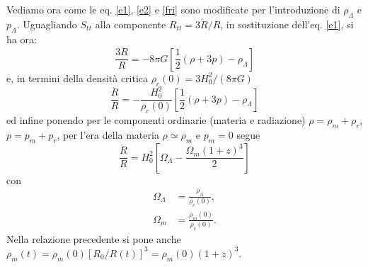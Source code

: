 Vediamo ora come le eq. \eqref{e1}, \eqref{e2} e \eqref{fri} sono modificate per
l'introduzione di $\rho_{\Lambda}$ e $p_{\Lambda}$.  Uguagliando $S_{tt}$ alla
componente $R_{tt}= 3 \ddot{R}/R$, in sostituzione dell'eq. \eqref{e1}, si ha
ora:
\begin{equation}
  \frac{3 \ddot{R}}{R} = - 8\pi G \left[ \frac{1}{2}  (\rho+3p) - \rho_{\Lambda}
  \right]
  \label{ecc1}
\end{equation}
e, in termini della densità critica $\rho_c(0)=3H_0^2/(8\pi G)$
\begin{equation}
  \frac {\ddot{R}} {R} = - \frac {H_0^2} {\rho_c(0)}
  \left[
    \frac {1}{2}  (\rho+3p) - \rho_{\Lambda}
  \right]
\label{2.63}
\end{equation}
ed infine ponendo per le componenti ordinarie (materia e radiazione)
$\rho=\rho_m+\rho_r$, $p=p_m+p_r$, per l'era della materia $\rho
\simeq \rho_m$ e $p_m=0$ segue
\begin{equation}
  \label{ddRcc}
  \frac {\ddot{R}} {R} = H_0^2
  \left[ \Omega_{\Lambda} -\frac{\Omega_m (1+z)^3}{2} \right]
\end{equation}
con
\begin{subequations}
  \begin{align}
    \Omega_{\Lambda} &= \frac{\rho_{\Lambda}}{\rho_c(0)}, \\
    \Omega_m       &= \frac{\rho_m(0)}{\rho_c(0)}.
  \end{align}
\end{subequations}
Nella relazione precedente si pone anche $\rho_m(t)=\rho_m(0) [R_0/R(t)]^3 = \rho_m(0) (1+z)^3$.

